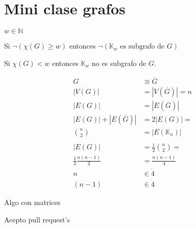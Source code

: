 \documentclass[../main.tex]{subfiles}
\begin{document}
\chapter{Mini clase grafos}%

\thispagestyle{fancy}

{$w\in\mathbb{N}$}

Si $\neg(\chi(G)\geq w)$ entonces $\neg(\mathbb{K}_w\text{ es subgrafo de }G)$

Si $\chi(G)< w$ entonces $\mathbb{K}_w$ no es subgrafo de $G$.

\begin{align*}
	G &\cong \overline{G}\\
	|V(G)| &= |V(\overline{G})| = n\\
	|E(G)| &= |E(\overline{G})|\\
	|E(G)| + |E(\overline{G})| &= 2 |E(G)| =\\
	\binom{n}{2} &= |E(\mathbb{K}_n)|\\
	\\
	|E(G)| &= \frac{1}{2} \binom{n}{2} =\\
	\frac{1}{2} \frac{n(n-1)}{2}  &= \frac{n(n-1)}{4}\\
	n &\in\dot{4}\\
	(n-1) &\in\dot{4}
\end{align*}

Algo con matrices

Acepto pull request's
\end{document}
